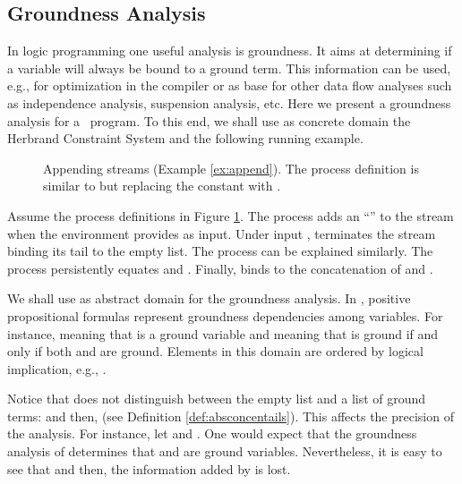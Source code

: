 \documentclass{tlp}
\begin{document}
\subsection{Groundness Analysis}\label{sec:ground}
In logic programming one useful  analysis is groundness. It aims at determining if a variable will always be bound to a ground term. This information can be used, e.g., for optimization in the compiler
 or as base for other data flow analyses such as independence analysis, suspension analysis, etc. Here we present a  groundness analysis for a \tccp\ program. To this end, we shall use as concrete domain the Herbrand Constraint System and the following running example. 
   \begin{figure}
\resizebox{\textwidth}{!}{

}
\caption{Appending streams (Example \ref{ex:append}). The process definition  is similar to   but replacing the constant  with . \label{fig-ex-append}}
\end{figure}
 \begin{example}[Append]\label{ex:append}
Assume the process definitions  in Figure \ref{fig-ex-append}.  The process  adds an ``'' to the stream    when the environment provides  as input. Under input ,  terminates the stream binding its tail to the empty list. The process   can be explained similarly.  The process  
persistently equates  and . Finally,   binds  to the concatenation of  and . 
\end{example}

We shall use  \cite{armstrong98two} as abstract domain for the groundness analysis.  In , positive propositional formulas 
represent groundness dependencies among variables. 
  For instance,  meaning that  is a ground variable and    meaning that     is ground if and only if both  and  are ground. 
Elements in this domain are ordered by logical implication, e.g., 
.



\begin{observation}
Notice that  does not distinguish between the empty list and a list of ground terms:   and then,    (see Definition \ref{def:absconcentails}).  This affects the precision of the analysis. For instance, let  and . 
One would expect that the groundness analysis of  determines that  and  are ground variables. Nevertheless, it is easy to see that   and then, the information added by  is lost.
\end{observation}
\end{document}
